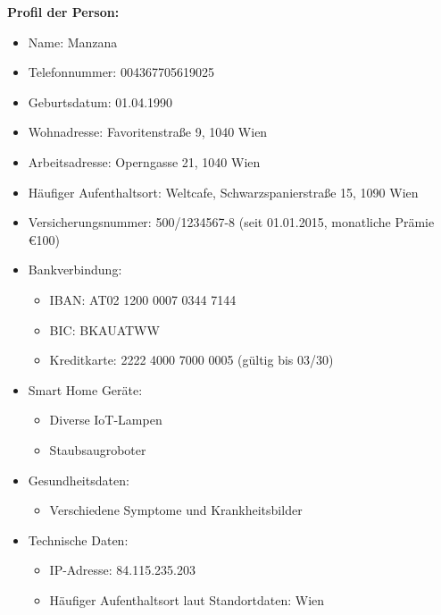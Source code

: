 \documentclass[12pt, a4paper, titlepage, oneside]{scrartcl}
\begin{document}
	\textbf{Profil der Person:}
	\begin{itemize}
		\item Name: Manzana

		\item Telefonnummer: 004367705619025

		\item Geburtsdatum: 01.04.1990

		\item Wohnadresse: Favoritenstraße 9, 1040 Wien

		\item Arbeitsadresse: Operngasse 21, 1040 Wien

		\item Häufiger Aufenthaltsort: Weltcafe, Schwarzspanierstraße 15, 1090 Wien

		\item Versicherungsnummer: 500/1234567-8 (seit 01.01.2015, monatliche Prämie
			€100)

		\item Bankverbindung:
			\begin{itemize}
				\item IBAN: AT02 1200 0007 0344 7144

				\item BIC: BKAUATWW

				\item Kreditkarte: 2222 4000 7000 0005 (gültig bis 03/30)
			\end{itemize}

		\item Smart Home Geräte:
			\begin{itemize}
				\item Diverse IoT-Lampen

				\item Staubsaugroboter
			\end{itemize}

		\item Gesundheitsdaten:
			\begin{itemize}
				\item Verschiedene Symptome und Krankheitsbilder
			\end{itemize}

		\item Technische Daten:
			\begin{itemize}
				\item IP-Adresse: 84.115.235.203

				\item Häufiger Aufenthaltsort laut Standortdaten: Wien
			\end{itemize}
	\end{itemize}
\end{document}
